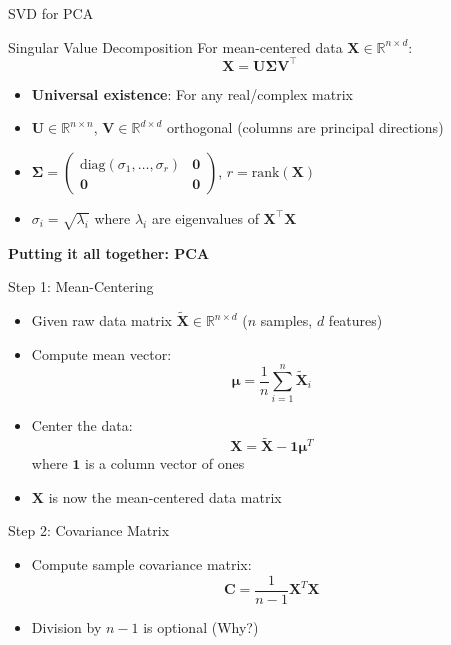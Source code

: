 \documentclass{beamer}
\begin{document}
\begin{frame}{SVD for PCA}
    \begin{block}{Singular Value Decomposition}
        For mean-centered data $\mathbf{X} \in \mathbb{R}^{n \times d}$:
        \[
        \mathbf{X} = \mathbf{U}\mathbf{\Sigma}\mathbf{V}^\top
        \]
        \begin{itemize}
            \item \textbf{Universal existence}: For any real/complex matrix
            \item $\mathbf{U} \in \mathbb{R}^{n \times n}$, $\mathbf{V} \in \mathbb{R}^{d \times d}$ orthogonal (columns are principal directions)
            \item $\mathbf{\Sigma} = \begin{pmatrix}
                \text{diag}(\sigma_1, \ldots, \sigma_r) & \mathbf{0} \\
                \mathbf{0} & \mathbf{0}
            \end{pmatrix}$, $r = \text{rank}(\mathbf{X})$
            \item $\sigma_i = \sqrt{\lambda_i}$ where $\lambda_i$ are eigenvalues of $\mathbf{X}^\top\mathbf{X}$
        \end{itemize}
    \end{block}
\end{frame}


\begin{frame}
    \LARGE \centering \textbf{Putting it all together: PCA}
\end{frame}

\begin{frame}{Step 1: Mean-Centering}
\begin{itemize}
\item Given raw data matrix $\mathbf{\tilde{X}} \in \mathbb{R}^{n \times d}$ ($n$ samples, $d$ features)
\item Compute mean vector:
\[
\boldsymbol{\mu} = \frac{1}{n}\sum_{i=1}^n \mathbf{\tilde{X}}_i
\]
\item Center the data:
\[
\mathbf{X} = \mathbf{\tilde{X}} - \mathbf{1}\boldsymbol{\mu}^T
\]
where $\mathbf{1}$ is a column vector of ones
\item $\mathbf{X}$ is now the mean-centered data matrix
\end{itemize}
\end{frame}

\begin{frame}{Step 2: Covariance Matrix}
\begin{itemize}
\item Compute sample covariance matrix:
\[
\mathbf{C} = \frac{1}{n-1} \mathbf{X}^T \mathbf{X}
\]
\item Division by $n-1$ is optional (Why?)
\end{itemize}
\end{frame}
\end{document}
